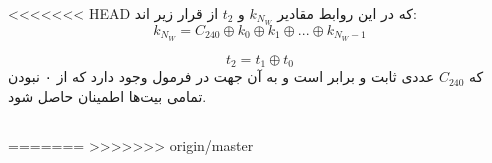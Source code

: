 <<<<<<< HEAD
که در این روابط مقادیر $k_{N_W}$ و
$t_2$
از قرار زیر اند:
$$
k_{N_W} = C_{240} \oplus k_0 \oplus k_1 \oplus ... \oplus k_{N_W - 1}
$$

$$
t_2 = t_1 \oplus t_0
$$
که $ C_{240} $ عددی ثابت و برابر  است و به آن جهت در فرمول وجود دارد که از ۰ نبودن تمامی بیت‌ها اطمینان حاصل شود.

\subsection{
}

\subsection{
}
=======
>>>>>>> origin/master
